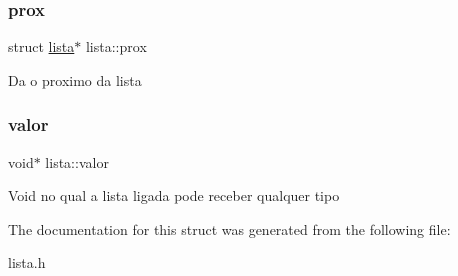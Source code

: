 \subsubsection{\texorpdfstring{prox}{prox}}
{\footnotesize\ttfamily struct \hyperlink{structlista}{lista}$\ast$ lista\+::prox}

Da o proximo da lista \mbox{\label{structlista_a1851230b0237deef0519ee33de9f2dd0}} 
\subsubsection{\texorpdfstring{valor}{valor}}
{\footnotesize\ttfamily void$\ast$ lista\+::valor}

Void no qual a lista ligada pode receber qualquer tipo 

The documentation for this struct was generated from the following file\+:\begin{DoxyCompactItemize}
\item 
lista.\+h\end{DoxyCompactItemize}
